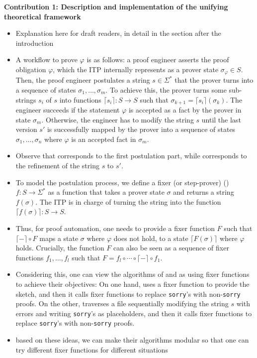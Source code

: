 \documentclass[10pt,conference]{IEEEtran}
\begin{document}
\medskip\noindent\textbf{Contribution 1: Description and implementation of the unifying theoretical framework}
\begin{itemize}
\item Explanation here for draft readers, in detail in the section after the introduction
\item A workflow to prove $\varphi$ is as follows: a proof engineer asserts the proof obligation $\varphi$, which the ITP internally represents as a prover state $\sigma_\varphi\in S$. Then, the proof engineer postulates a string $s\in\Sigma^*$ that the prover turns into a sequence of states $\sigma_1, \dots, \sigma_m$. To achieve this, the prover turns some sub-strings $s_i$ of $s$ into functions $\lceil s_i\rceil: S\to S$ such that $\sigma_{k+1}=\lceil s_i\rceil(\sigma_k)$. The engineer succeeds if the statement $\varphi$ is accepted as a fact by the prover in state $\sigma_m$. Otherwise, the engineer has to modify the string $s$ until the last version $s'$ is successfully mapped by the prover into a sequence of states $\sigma_1, \dots, \sigma_n$ where $\varphi$ is an accepted fact in $\sigma_m$.
\item Observe that \supersketch{} corresponds to the first postulation part, while \superfix{} corresponds to the refinement of the string $s$ to $s'$.
\item To model the postulation process, we define a fixer (or step-prover) () $f: S\to \Sigma^*$ as a function that takes a prover state $\sigma$ and returns a string $f(\sigma)$. The ITP is in charge of turning the string into the function $\lceil f(\sigma)\rceil: S\to S$.
\item Thus, for proof automation, one needs to provide a fixer function $F$ such that $\lceil -\rceil \circ F$ maps a state $\sigma$ where $\varphi$ does not hold, to a state $\lceil F(\sigma)\rceil$ where $\varphi$ holds. Crucially, the function $F$ can also be seen as a sequence of fixer functions $f_1,\dots,f_l$ such that $F = f_l\circ\cdots\circ\lceil -\rceil \circ f_1$.
\item Considering this, one can view the algorithms of \supersketch{} and \superfix{} as using fixer functions to achieve their objectives: On one hand, \supersketch{} uses a fixer function to provide the sketch, and then it calls fixer functions to replace \texttt{sorry}'s with non-\texttt{sorry} proofs. On the other, \superfix{} traverses a file sequentially modifying the string $s$ with errors and writing \texttt{sorry}'s as placeholders, and then it calls fixer functions to replace \texttt{sorry}'s with non-\texttt{sorry} proofs.
\item based on these ideas, we can make their algorithms modular so that one can try different fixer functions for different situations
\end{itemize}
\end{document}
